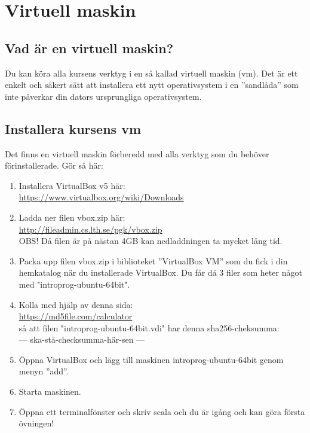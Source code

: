 
\chapter{Virtuell maskin}\label{appendix:vbox}

\section{Vad är en virtuell maskin?}

Du kan köra alla kursens verktyg i en så kallad virtuell maskin (vm). Det är ett enkelt och säkert sätt att installera ett nytt operativsystem i en ''sandlåda'' som inte påverkar din dators ursprungliga operativsystem. 

\section{Installera kursens vm}
Det finns en virtuell maskin förberedd med alla verktyg som du behöver förinstallerade. Gör så här:
\begin{enumerate}
\item     Installera VirtualBox v5 här: \\ \url{https://www.virtualbox.org/wiki/Downloads}
\item     Ladda ner filen vbox.zip här: \\ \url{http://fileadmin.cs.lth.se/pgk/vbox.zip} \\ OBS! Då filen är på nästan 4GB kan nedladdningen ta mycket lång tid.
\item     Packa upp filen vbox.zip i biblioteket ''VirtualBox VM'' som du fick i din hemkatalog när du installerade VirtualBox. Du får då 3 filer som heter något med "introprog-ubuntu-64bit".
\item     Kolla med hjälp av denna sida: \\ \url{https://md5file.com/calculator} \\ så att filen "introprog-ubuntu-64bit.vdi" har denna sha256-cheksumma: \\ --- ska-stå-checksumma-här-sen ---
\item     Öppna VirtualBox och lägg till maskinen introprog-ubuntu-64bit genom menyn ''add''.
\item     Starta maskinen.
\item     Öppna ett terminalfönster och skriv scala och du är igång och kan göra första övningen!
\end{enumerate}

